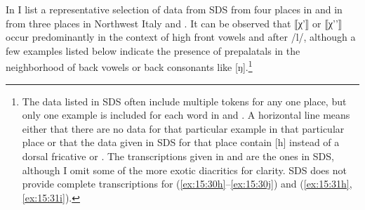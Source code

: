 {In  I list a representative selection of data from SDS from four places in  and in  from three places in Northwest Italy and . It can be observed that ⟦χ'⟧ or ⟦χ'{}'⟧ occur predominantly in the context of high front vowels and after /l/, although a few examples listed below indicate the presence of prepalatals in the neighborhood of back vowels or back consonants like [ŋ].\footnote{The data listed in SDS often include multiple tokens for any one place, but only one example is included for each word in  and . A horizontal line means either that there are no data for that particular example in that particular place or that the data given in SDS for that place contain [h] instead of a dorsal fricative or . The transcriptions given in  and  are the ones in SDS, although I omit some of the more exotic diacritics for clarity. SDS does not provide complete transcriptions for (\ref{ex:15:30h}--\ref{ex:15:30j}) and (\ref{ex:15:31h}, \ref{ex:15:31i}).}


}
